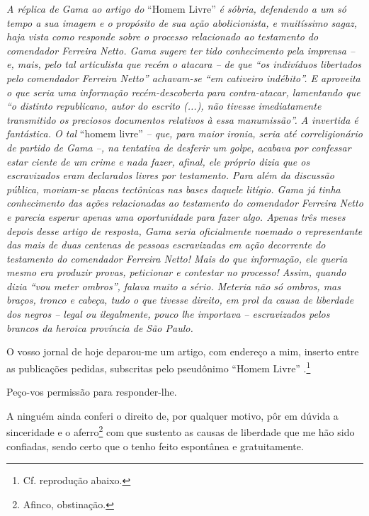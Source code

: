 \begin{didascalia}
\emph{A réplica de Gama ao artigo do} ``Homem Livre'' \emph{é sóbria,
defendendo a um só tempo a sua imagem e o propósito de sua ação
abolicionista, e muitíssimo sagaz, haja vista como responde sobre o
processo relacionado ao testamento do comendador Ferreira Netto. Gama
sugere ter tido conhecimento pela imprensa -- e, mais, pelo tal
articulista que recém o atacara -- de que ``os indivíduos libertados pelo
comendador Ferreira Netto'' achavam-se ``em cativeiro indébito''. E
aproveita o que seria uma informação recém-descoberta para
contra-atacar, lamentando que ``o distinto republicano, autor do escrito
(...), não tivesse imediatamente transmitido os preciosos documentos
relativos à essa manumissão''. A invertida é fantástica. O tal} ``homem
livre'' \emph{-- que, para maior ironia, seria até correligionário de
partido de Gama --, na tentativa de desferir um golpe, acabava por
confessar estar ciente de um crime e nada fazer, afinal, ele próprio
dizia que os escravizados eram declarados livres por testamento. Para
além da discussão pública, moviam-se placas tectônicas nas bases daquele
litígio. Gama já tinha conhecimento das ações relacionadas ao testamento
do comendador Ferreira Netto e parecia esperar apenas uma oportunidade
para fazer algo. Apenas três meses depois desse artigo de resposta, Gama
seria oficialmente noemado o representante das mais de duas centenas de
pessoas escravizadas em ação decorrente do testamento do comendador
Ferreira Netto! Mais do que informação, ele queria mesmo era produzir
provas, peticionar e contestar no processo! Assim, quando dizia ``vou
meter ombros'', falava muito a sério. Meteria não só ombros, mas braços,
tronco e cabeça, tudo o que tivesse direito, em prol da causa de
liberdade dos negros -- legal ou ilegalmente, pouco lhe importava --
escravizados pelos brancos da heroica província de São Paulo.}
\end{didascalia}

\asterisc{}

O vosso jornal de hoje deparou-me um artigo, com endereço a mim, inserto
entre as publicações pedidas, subscritas pelo pseudônimo ``Homem Livre''
.\footnote{ Cf. reprodução abaixo.}

Peço-vos permissão para responder-lhe.

A ninguém ainda conferi o direito de, por qualquer motivo, pôr em dúvida
a sinceridade e o aferro\footnote{ Afinco, obstinação.} com que
sustento as causas de liberdade que me hão sido confiadas, sendo certo
que o tenho feito espontânea e gratuitamente.

